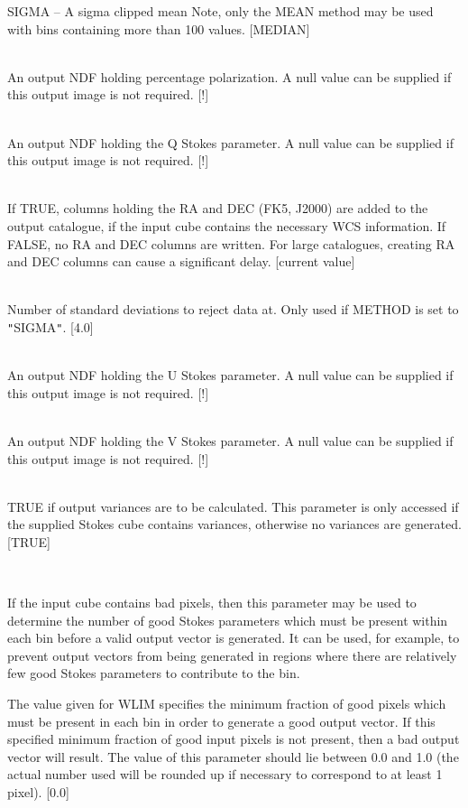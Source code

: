 \documentclass[twoside,11pt]{article}
\renewcommand{\_}{\texttt{\symbol{95}}}
\newcommand{\sstsubsection}[1]{ \item[{#1}] \mbox{} \\}
\newcommand{\sstnotes}[1]{\item[Notes:] \mbox{} \\[1.3ex] #1}
\newcommand{\sstitemlist}[1]{
  \mbox{} \\
  \vspace{-3.5ex}
  \begin{itemize}
     #1
  \end{itemize}
}
\newcommand{\sstitem}{\item}
\newcommand{\sstsubsection}[1]{\item[{#1}]}
\newcommand{\sstnotes}[1]{\item[Notes:] #1 }
\newcommand{\sstitemlist}[1]{
      \begin{itemize}
         #1
      \end{itemize}
      \\
   }
\newcommand{\sstitem}{\item}
\begin{document}
{{{{            \sstitem
               SIGMA     -- A sigma clipped mean
            Note, only the MEAN method may be used with bins containing more
            than 100 values. [MEDIAN]
         }
      }
      \sstsubsection{
         P = NDF (Write)
      }{
         An output NDF holding percentage polarization. A null value can be
         supplied if this output image is not required. [!]
      }
      \sstsubsection{
         Q = NDF (Write)
      }{
         An output NDF holding the Q Stokes parameter. A null value can be
         supplied if this output image is not required. [!]
      }
      \sstsubsection{
         RADEC = \_LOGICAL (Read)
      }{
         If TRUE, columns holding the RA and DEC (FK5, J2000) are added
         to the output catalogue, if the input cube contains the necessary
         WCS information. If FALSE, no RA and DEC columns are written. For
         large catalogues, creating RA and DEC columns can cause a
         significant delay. [current value]
      }
      \sstsubsection{
         SIGMAS = \_REAL (Read)
      }{
         Number of standard deviations to reject data at. Only used if
         METHOD is set to {\tt "}SIGMA{\tt "}. [4.0]
      }
      \sstsubsection{
         U = NDF (Write)
      }{
         An output NDF holding the U Stokes parameter. A null value can be
         supplied if this output image is not required. [!]
      }
      \sstsubsection{
         V = NDF (Write)
      }{
         An output NDF holding the V Stokes parameter. A null value can be
         supplied if this output image is not required. [!]
      }
      \sstsubsection{
         VARIANCE = \_LOGICAL (Read)
      }{
         TRUE if output variances are to be calculated.  This parameter
         is only accessed if the supplied Stokes cube contains variances,
         otherwise no variances are generated.  [TRUE]
      }
      \sstsubsection{
         WLIM = \_REAL (Read)
      }{
         If the input cube contains bad pixels, then this parameter
         may be used to determine the number of good Stokes parameters
         which must be present within each bin before a valid output vector
         is generated.  It can be used, for example, to prevent output
         vectors from being generated in regions where there are relatively
         few good Stokes parameters to contribute to the bin.

         The value given for WLIM specifies the minimum fraction of
         good pixels which must be present in each bin in order to
         generate a good output vector. If this specified minimum fraction
         of good input pixels is not present, then a bad output vector
         will result. The value of this parameter should lie between 0.0
         and 1.0 (the actual number used will be rounded up if necessary
         to correspond to at least 1 pixel). [0.0]
      }
   }
   \sstnotes{
      \sstitemlist{

}}}
\end{document}
